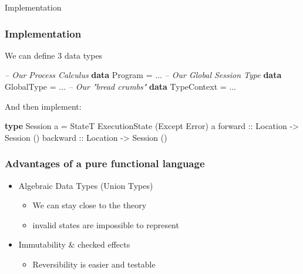 \documentclass[12pt]{beamer}
\newenvironment{Shaded}{}{}
\newcommand{\KeywordTok}[1]{\textcolor[rgb]{0.00,0.44,0.13}{\textbf{#1}}}
\newcommand{\DataTypeTok}[1]{\textcolor[rgb]{0.56,0.13,0.00}{#1}}
\newcommand{\CommentTok}[1]{\textcolor[rgb]{0.38,0.63,0.69}{\textit{#1}}}
\newcommand{\OtherTok}[1]{\textcolor[rgb]{0.00,0.44,0.13}{#1}}
\newcommand{\FunctionTok}[1]{\textcolor[rgb]{0.02,0.16,0.49}{#1}}
\newcommand{\NormalTok}[1]{#1}
\begin{document}
\begin{frame}
\begin{center}
    \LARGE{Implementation} 
\end{center}
\end{frame}



\begin{frame}[fragile]
\frametitle{Implementation}
    We can define 3 data types 
    \begin{Shaded}
        \begin{Highlighting}[]
            \CommentTok{-- Our Process Calculus}
            \KeywordTok{data} \DataTypeTok{Program} \FunctionTok{=} \NormalTok{...} 
            \CommentTok{-- Our Global Session Type} 
            \KeywordTok{data} \DataTypeTok{GlobalType} \FunctionTok{=} \NormalTok{...} 
            \CommentTok{-- Our "bread crumbs"} 
            \KeywordTok{data} \DataTypeTok{TypeContext} \FunctionTok{=} \NormalTok{...} 
        \end{Highlighting}
    \end{Shaded}
    And then implement:
    \begin{Shaded}
        \begin{Highlighting}[]
            \KeywordTok{type} \DataTypeTok{Session} \NormalTok{a }\FunctionTok{=} \DataTypeTok{StateT} \DataTypeTok{ExecutionState} \NormalTok{(}\DataTypeTok{Except} \DataTypeTok{Error}\NormalTok{) a}
            \OtherTok{forward  ::} \DataTypeTok{Location} \OtherTok{->} \DataTypeTok{Session} \NormalTok{()}
            \OtherTok{backward ::} \DataTypeTok{Location} \OtherTok{->} \DataTypeTok{Session} \NormalTok{()}
        \end{Highlighting}
    \end{Shaded}

\end{frame}

\begin{frame}[fragile]
\frametitle{Advantages of a pure functional language}


\begin{itemize}
    \item Algebraic Data Types (Union Types) 
        \begin{itemize}
            \item         We can stay close to the theory 
            \item         invalid states are impossible to represent
        \end{itemize}
        \vspace*{0.2cm}
    \item Immutability \& checked effects  
        \begin{itemize}
            \item Reversibility is easier and testable 
        \end{itemize}

\end{itemize}

\end{frame}
\end{document}
